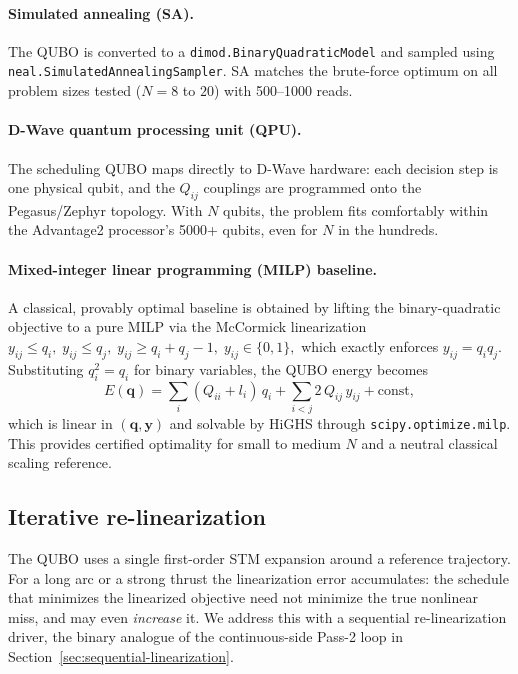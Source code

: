 \documentclass[8pt,a4paper]{article}
\newcommand{\bvec}[1]{\bm{#1}}
\theoremstyle{definition}
\theoremstyle{remark}
\begin{document}
\paragraph{Simulated annealing (SA).}
The QUBO is converted to a \texttt{dimod.BinaryQuadraticModel} and
sampled using \texttt{neal.SimulatedAnnealingSampler}.  SA matches
the brute-force optimum on all problem sizes tested ($N = 8$ to $20$)
with 500--1000 reads.

\paragraph{D-Wave quantum processing unit (QPU).}
The scheduling QUBO maps directly to D-Wave hardware: each decision
step is one physical qubit, and the $Q_{ij}$ couplings are programmed
onto the Pegasus/Zephyr topology.  With $N$ qubits, the problem fits
comfortably within the Advantage2 processor's 5000+ qubits, even for
$N$ in the hundreds.

\paragraph{Mixed-integer linear programming (MILP) baseline.}
A classical, provably optimal baseline is obtained by lifting the
binary-quadratic objective to a pure MILP via the McCormick
linearization
\(
  y_{ij} \le q_i,\;
  y_{ij} \le q_j,\;
  y_{ij} \ge q_i + q_j - 1,\;
  y_{ij} \in \{0,1\},
\)
which exactly enforces $y_{ij} = q_i q_j$.  Substituting
$q_i^2 = q_i$ for binary variables, the QUBO energy becomes
\[
  E(\bvec q) = \sum_{i} (Q_{ii} + l_i)\, q_i
             + \sum_{i<j} 2\, Q_{ij}\, y_{ij} + \mathrm{const},
\]
which is linear in $(\bvec q, \bvec y)$ and solvable by HiGHS through
\texttt{scipy.optimize.milp}.  This provides certified optimality for
small to medium $N$ and a neutral classical scaling reference.

\subsection{Iterative re-linearization}\label{sec:iterative-relinearization}

The QUBO uses a single first-order STM expansion around a reference
trajectory.  For a long arc or a strong thrust the linearization
error accumulates: the schedule that minimizes the linearized
objective need not minimize the true nonlinear miss, and may even
\emph{increase} it.  We address this with a sequential
re-linearization driver, the binary analogue of the continuous-side
Pass-2 loop in Section~\ref{sec:sequential-linearization}.
\end{document}
